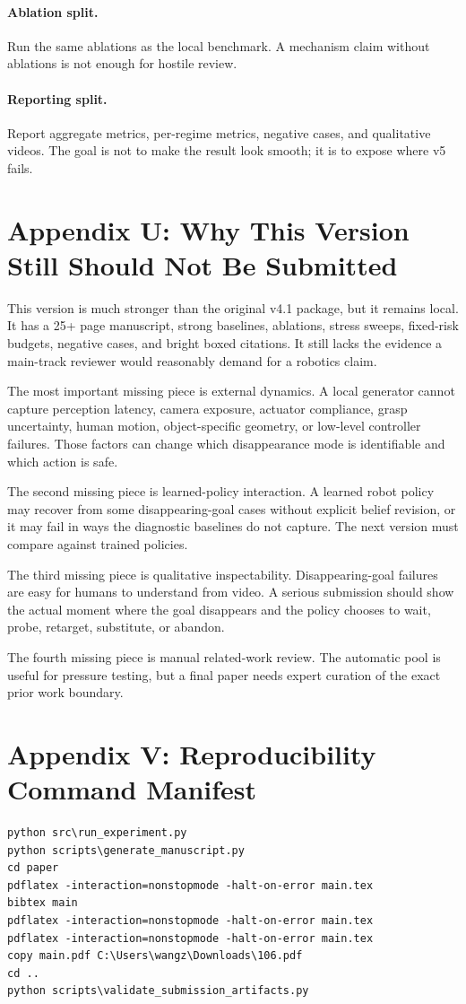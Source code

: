 \documentclass{article}
\begin{document}
\paragraph{Ablation split.}
Run the same ablations as the local benchmark. A mechanism claim without ablations is not enough for hostile review.

\paragraph{Reporting split.}
Report aggregate metrics, per-regime metrics, negative cases, and qualitative videos. The goal is not to make the result look smooth; it is to expose where v5 fails.

\section{Appendix U: Why This Version Still Should Not Be Submitted}
This version is much stronger than the original v4.1 package, but it remains local. It has a 25+ page manuscript, strong baselines, ablations, stress sweeps, fixed-risk budgets, negative cases, and bright boxed citations. It still lacks the evidence a main-track reviewer would reasonably demand for a robotics claim.

The most important missing piece is external dynamics. A local generator cannot capture perception latency, camera exposure, actuator compliance, grasp uncertainty, human motion, object-specific geometry, or low-level controller failures. Those factors can change which disappearance mode is identifiable and which action is safe.

The second missing piece is learned-policy interaction. A learned robot policy may recover from some disappearing-goal cases without explicit belief revision, or it may fail in ways the diagnostic baselines do not capture. The next version must compare against trained policies.

The third missing piece is qualitative inspectability. Disappearing-goal failures are easy for humans to understand from video. A serious submission should show the actual moment where the goal disappears and the policy chooses to wait, probe, retarget, substitute, or abandon.

The fourth missing piece is manual related-work review. The automatic pool is useful for pressure testing, but a final paper needs expert curation of the exact prior work boundary.

\section{Appendix V: Reproducibility Command Manifest}
\begin{verbatim}
python src\run_experiment.py
python scripts\generate_manuscript.py
cd paper
pdflatex -interaction=nonstopmode -halt-on-error main.tex
bibtex main
pdflatex -interaction=nonstopmode -halt-on-error main.tex
pdflatex -interaction=nonstopmode -halt-on-error main.tex
copy main.pdf C:\Users\wangz\Downloads\106.pdf
cd ..
python scripts\validate_submission_artifacts.py
\end{verbatim}
\end{document}
